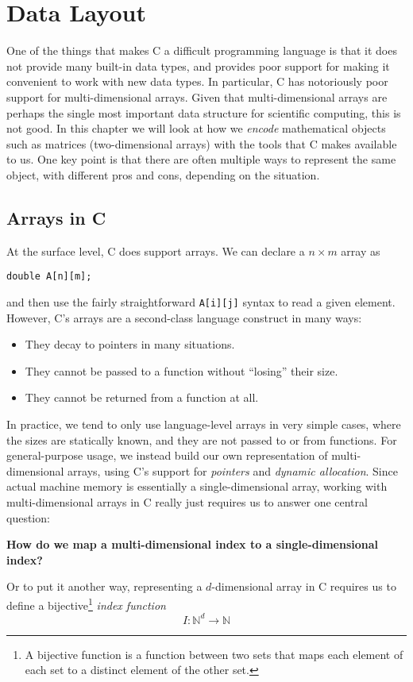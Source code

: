 \lstset{language=C}

\chapter{Data Layout}

One of the things that makes C a difficult programming language is
that it does not provide many built-in data types, and provides poor
support for making it convenient to work with new data types.  In
particular, C has notoriously poor support for multi-dimensional
arrays.  Given that multi-dimensional arrays are perhaps the single
most important data structure for scientific computing, this is not
good.  In this chapter we will look at how we \textit{encode}
mathematical objects such as matrices (two-dimensional arrays) with
the tools that C makes available to us.  One key point is that there
are often multiple ways to represent the same object, with different
pros and cons, depending on the situation.

\section{Arrays in C}

At the surface level, C does support arrays.  We can declare a
$n\times{}m$ array as
\begin{lstlisting}
double A[n][m];
\end{lstlisting}
and then use the fairly straightforward \lstinline{A[i][j]} syntax to
read a given element.  However, C's arrays are a second-class language
construct in many ways:

\begin{itemize}
\item They decay to pointers in many situations.
\item They cannot be passed to a function without ``losing'' their
  size.
\item They cannot be returned from a function at all.
\end{itemize}

In practice, we tend to only use language-level arrays in very simple
cases, where the sizes are statically known, and they are not passed
to or from functions.  For general-purpose usage, we instead build our
own representation of multi-dimensional arrays, using C's support for
\textit{pointers} and \textit{dynamic allocation}.  Since actual
machine memory is essentially a single-dimensional array, working with
multi-dimensional arrays in C really just requires us to answer one
central question:
\begin{center}
  \textbf{How do we map a multi-dimensional index to a
    single-dimensional index?}
\end{center}
Or to put it another way, representing a $d$-dimensional array in C
requires us to define a bijective\footnote{A bijective function is a
  function between two sets that maps each element of each set to a
  distinct element of the other set.} \textit{index function}
\begin{equation}
  I : \mathbb{N}^{d} \rightarrow \mathbb{N}
\end{equation}

